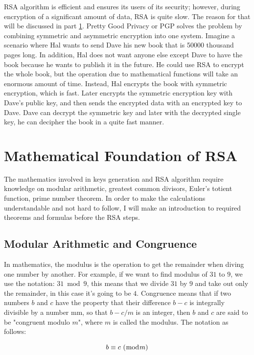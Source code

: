\documentclass[a4paper, 12pt]{article}
\begin{document}
RSA algorithm is efficient and ensures its users of its security; however, during encryption of a
significant amount of data, RSA is quite slow. The reason for that will be discussed in part \ref{sec:math}. Pretty
Good Privacy or PGP solves the problem by combining symmetric and asymmetric encryption
into one system. Imagine a scenario where Hal wants to send Dave his new book that is 50000
thousand pages long. In addition, Hal does not want anyone else except Dave to have the book
because he wants to publish it in the future. He could use RSA to encrypt the whole book, but the
operation due to mathematical functions will take an enormous amount of time. Instead, Hal
encrypts the book with symmetric encryption, which is fast. Later encrypts the symmetric
encryption key with Dave’s public key, and then sends the encrypted data with an encrypted key
to Dave. Dave can decrypt the symmetric key and later with the decrypted single key, he can
decipher the book in a quite fast manner.

\section{Mathematical Foundation of RSA}
\label{sec:math}

The mathematics involved in keys generation and RSA algorithm require knowledge on modular
arithmetic, greatest common divisors, Euler's totient function, prime number theorem. In order to
make the calculations understandable and not hard to follow, I will make an introduction to
required theorems and formulas before the RSA steps.

\subsection{Modular Arithmetic and Congruence}
\label{bsec:mod}

In mathematics, the modulus is the operation to get the remainder when diving one number by
another. For example, if we want to find modulus of $31$ to $9$, we use the notation: $31\bmod9$, this
means that we divide $31$ by $9$ and take out only the remainder, in this case it's going to be $4$.
Congruence means that if two numbers $b$ and $c$ have the property that their difference $b - c$ is
integrally divisible by a number mm, so that $b - c/m$ is an integer, then $b$ and $c$ are said to be
"congruent modulo $m$", where $m$ is called the modulus. The notation as follows:

\begin{equation*}
  b \equiv c \text{ } (\bmod m)\\
  \end{equation*}
\end{document}

